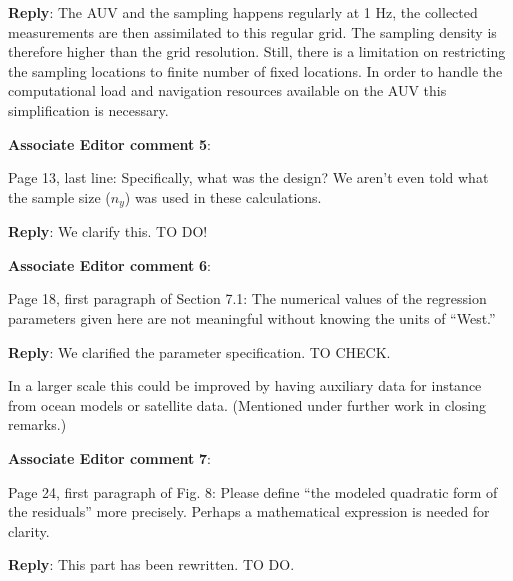 \documentclass[a4paper]{article}
\def\aecom{\textbf{Associate Editor comment }}
\def\reply{\textbf{Reply}}
\begin{document}
\reply: The AUV and the sampling happens regularly at 1 Hz, the collected measurements are then assimilated to this regular grid. The sampling density is therefore higher than the grid resolution. Still, there is a limitation on restricting the sampling locations to finite number of fixed locations. In order to handle the computational load and navigation resources available on the AUV this simplification is necessary. %
\vspace{1em}

\vspace{5mm}
\noindent \aecom \textbf{5}:

Page 13, last line: Specifically, what was the design? We aren’t even told what the sample size ($n_y$) was used in these calculations.\par

\reply: We clarify this. TO DO!

\vspace{1em}

\vspace{5mm}
\noindent \aecom \textbf{6}:

Page 18, first paragraph of Section 7.1: The numerical values of the regression parameters given here are not meaningful without knowing the units of “West.”\par

\reply: We clarified the parameter specification. TO CHECK.

In a larger scale this could be improved by having auxiliary data for instance from ocean models or satellite data. (Mentioned under further work in closing remarks.)

\vspace{1em}

\vspace{5mm}
\noindent \aecom \textbf{7}:

Page 24, first paragraph of Fig. 8: Please define “the modeled quadratic form of the residuals” more precisely. Perhaps a mathematical expression is needed for clarity.\par

\reply: This part has been rewritten. TO DO.

\vspace{1em}
\end{document}
